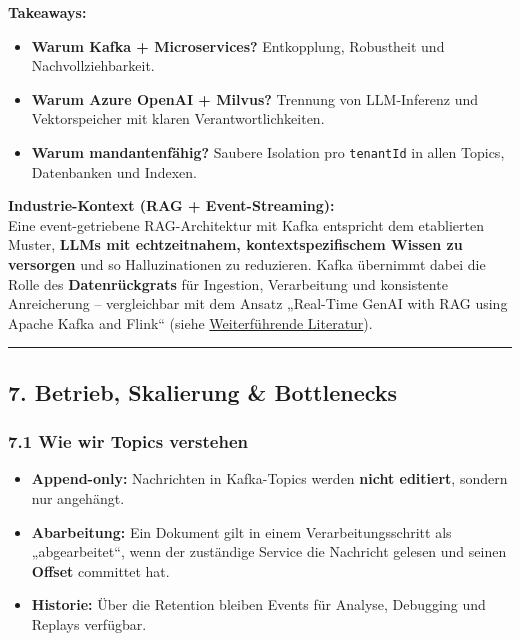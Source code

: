 \textbf{Takeaways:}

\begin{itemize}
\tightlist
\item
  \textbf{Warum Kafka + Microservices?} Entkopplung, Robustheit und
  Nachvollziehbarkeit.
\item
  \textbf{Warum Azure OpenAI + Milvus?} Trennung von LLM-Inferenz und
  Vektorspeicher mit klaren Verantwortlichkeiten.
\item
  \textbf{Warum mandantenfähig?} Saubere Isolation pro \texttt{tenantId}
  in allen Topics, Datenbanken und Indexen.
\end{itemize}

\textbf{Industrie-Kontext (RAG + Event-Streaming):}\\
Eine event-getriebene RAG-Architektur mit Kafka entspricht dem
etablierten Muster, \textbf{LLMs mit echtzeitnahem, kontextspezifischem
Wissen zu versorgen} und so Halluzinationen zu reduzieren. Kafka
übernimmt dabei die Rolle des \textbf{Datenrückgrats} für Ingestion,
Verarbeitung und konsistente Anreicherung -- vergleichbar mit dem Ansatz
„Real-Time GenAI with RAG using Apache Kafka and Flink`` (siehe
\hyperref[9-weiterfuxfchrende-literatur--referenzen]{Weiterführende
Literatur}).

\begin{center}\rule{0.5\linewidth}{0.5pt}\end{center}

\subsection{7. Betrieb, Skalierung \&
Bottlenecks}\label{betrieb-skalierung-bottlenecks}

\subsubsection{7.1 Wie wir Topics
verstehen}\label{wie-wir-topics-verstehen}

\begin{itemize}
\tightlist
\item
  \textbf{Append-only:} Nachrichten in Kafka-Topics werden \textbf{nicht
  editiert}, sondern nur angehängt.\\
\item
  \textbf{Abarbeitung:} Ein Dokument gilt in einem Verarbeitungsschritt
  als „abgearbeitet``, wenn der zuständige Service die Nachricht gelesen
  und seinen \textbf{Offset} committet hat.\\
\item
  \textbf{Historie:} Über die Retention bleiben Events für Analyse,
  Debugging und Replays verfügbar.
\end{itemize}

